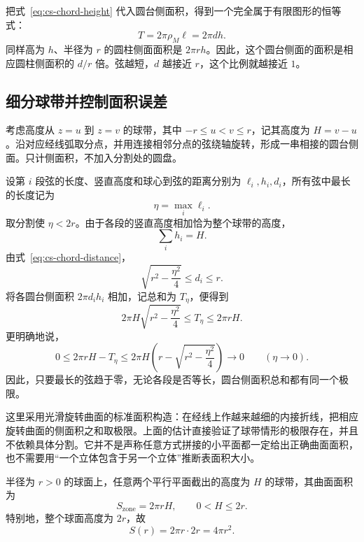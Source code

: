 \documentclass[UTF8,12pt,a4paper,fontset=fandol]{ctexart}
\begin{document}
把式~\eqref{eq:cs-chord-height} 代入圆台侧面积，得到一个完全属于有限图形的恒等式：
\begin{equation}\label{eq:cs-zone-frustum}
  \boxed{T=2\pi\rho_M\ell=2\pi dh}.
\end{equation}
同样高为 $h$、半径为 $r$ 的圆柱侧面面积是 $2\pi rh$。因此，这个圆台侧面的面积是相应圆柱侧面积的 $d/r$ 倍。弦越短，$d$ 越接近 $r$，这个比例就越接近 $1$。

\subsection{细分球带并控制面积误差}

考虑高度从 $z=u$ 到 $z=v$ 的球带，其中 $-r\leq u<v\leq r$，记其高度为 $H=v-u$。沿对应经线弧取分点，并用连接相邻分点的弦绕轴旋转，形成一串相接的圆台侧面。只计侧面积，不加入分割处的圆盘。

设第 $i$ 段弦的长度、竖直高度和球心到弦的距离分别为 $\ell_i,h_i,d_i$，所有弦中最长的长度记为
\[
  \eta=\max_i\ell_i.
\]
取分割使 $\eta<2r$。由于各段的竖直高度相加恰为整个球带的高度，
\[
  \sum_i h_i=H.
\]
由式~\eqref{eq:cs-chord-distance}，
\[
  \sqrt{r^2-\frac{\eta^2}{4}}\leq d_i\leq r.
\]
将各圆台侧面积 $2\pi d_ih_i$ 相加，记总和为 $T_{\eta}$，便得到
\begin{equation}\label{eq:cs-zone-squeeze}
  2\pi H\sqrt{r^2-\frac{\eta^2}{4}}
  \leq T_{\eta}\leq2\pi rH.
\end{equation}
更明确地说，
\[
  0\leq2\pi rH-T_{\eta}
  \leq2\pi H\left(r-\sqrt{r^2-\frac{\eta^2}{4}}\right)
  \longrightarrow0\qquad(\eta\to0).
\]
因此，只要最长的弦趋于零，无论各段是否等长，圆台侧面积总和都有同一个极限。

这里采用光滑旋转曲面的标准面积构造：在经线上作越来越细的内接折线，把相应旋转曲面的侧面积之和取极限。上面的估计直接验证了球带情形的极限存在，并且不依赖具体分割。它并不是声称任意方式拼接的小平面都一定给出正确曲面面积，也不需要用“一个立体包含于另一个立体”推断表面积大小。

\begin{theorem}[球带面积与球面面积]
半径为 $r>0$ 的球面上，任意两个平行平面截出的高度为 $H$ 的球带，其曲面面积为
\begin{equation}\label{eq:cs-zone-area}
  \boxed{S_{\mathrm{zone}}=2\pi rH},\qquad 0<H\leq2r.
\end{equation}
特别地，整个球面高度为 $2r$，故
\begin{equation}\label{eq:cs-sphere-area}
  \boxed{S(r)=2\pi r\cdot2r=4\pi r^2}.
\end{equation}
\end{theorem}
\end{document}
